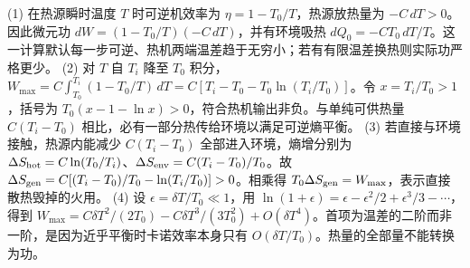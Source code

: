 (1) 在热源瞬时温度 \(T\) 时可逆机效率为 \(\eta=1-T_0/T\)，热源放热量为 \(-C\,dT>0\)。因此微元功 \(dW=(1-T_0/T)(-C\,dT)\)，并有环境吸热 \(dQ_0=-CT_0\,dT/T\)。这一计算默认每一步可逆、热机两端温差趋于无穷小；若有有限温差换热则实际功严格更少。
(2) 对 \(T\) 自 \(T_i\) 降至 \(T_0\) 积分，\(W_{\max}=C\int_{T_0}^{T_i}(1-T_0/T)\,dT=C[T_i-T_0-T_0\ln(T_i/T_0)]\)。令 \(x=T_i/T_0>1\)，括号为 \(T_0(x-1-\ln x)>0\)，符合热机输出非负。与单纯可供热量 \(C(T_i-T_0)\) 相比，必有一部分热传给环境以满足可逆熵平衡。
(3) 若直接与环境接触，热源内能减少 \(C(T_i-T_0)\) 全部进入环境，熵增分别为 \(\Delta S_{\rm hot}=C\ln(T_0/T_i)\)、\(\Delta S_{\rm env}=C(T_i-T_0)/T_0\)。故 \(\Delta S_{\rm gen}=C[(T_i-T_0)/T_0-\ln(T_i/T_0)]>0\)。相乘得 \(T_0\Delta S_{\rm gen}=W_{\max}\)，表示直接散热毁掉的火用。
(4) 设 \(\epsilon=\delta T/T_0\ll1\)，用 \(\ln(1+\epsilon)=\epsilon-\epsilon^2/2+\epsilon^3/3-\cdots\)，得到 \(W_{\max}=C\delta T^2/(2T_0)-C\delta T^3/(3T_0^2)+O(\delta T^4)\)。首项为温差的二阶而非一阶，是因为近乎平衡时卡诺效率本身只有 \(O(\delta T/T_0)\)。热量的全部量不能转换为功。

